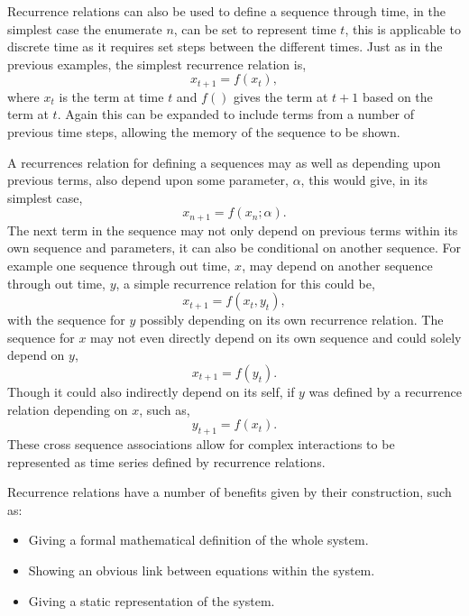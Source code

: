 \documentclass{article}
\begin{document}
Recurrence relations can also be used to define a sequence through time, in the simplest case the enumerate $n$, can be set to represent time $t$, this is applicable to discrete time as it requires set steps between the different times. Just as in the previous examples, the simplest recurrence relation is,  
\begin{equation}
x_{t+1} = f(x_{t}),
\end{equation}
where $x_{t}$ is the term at time $t$ and $f()$ gives the term at $t+1$ based on the term at $t$. Again this can be expanded to include terms from a number of previous time steps, allowing the memory of the sequence to be shown.
 
A recurrences relation for defining a sequences may as well as depending upon previous terms, also depend upon some parameter, $\alpha$, this would give, in its simplest case, 
\begin{equation}
x_{n+1} = f(x_{n}; \alpha).
\end{equation}
The next term in the sequence may not only depend on previous terms within its own sequence and parameters, it can also be conditional on another sequence. For example one sequence through out time, $x$, may depend on another sequence through out time, $y$, a simple recurrence relation for this could be,
\begin{equation}
x_{t+1} = f(x_{t}, y_{t}),
\end{equation}
with the sequence for $y$ possibly depending on its own recurrence relation. The sequence for $x$ may not even directly depend on its own sequence and could solely depend on $y$, 
\begin{equation}
x_{t+1} = f(y_{t}).
\end{equation}
Though it could also indirectly depend on its self, if $y$ was defined by a recurrence relation depending on $x$, such as, 
\begin{equation}
y_{t+1} = f(x_{t}).
\end{equation}
These cross sequence associations allow for complex interactions to be represented as time series defined by recurrence relations.

Recurrence relations have a number of benefits given by their construction, such as:
\begin{itemize}
    \item Giving a formal mathematical definition of the whole system.
    \item Showing an obvious link between equations within the system.
    \item Giving a static representation of the system.
\end{itemize}
\end{document}
